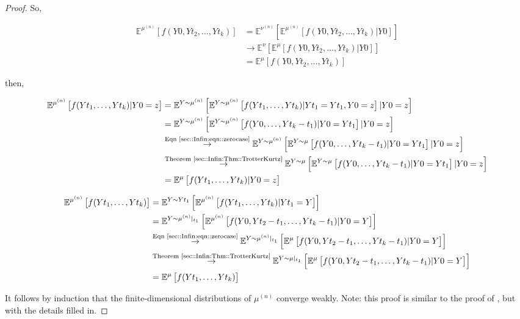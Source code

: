 \documentclass[12pt]{article}
\newcommand{\mb}{\mathbb}
\newcommand{\ra}{\rightarrow}
\newcommand{\os}{\overset}
\newcommand{\te}{\text}
\newcommand{\exmu}[2]{\mb{E}^{#1}\left[#2\right]}	%
\renewcommand{\t}{t}							%
\newcommand{\sln}[1]{^{(#1)}}					%
\newcommand{\indx}[1]{_{#1}}					%
\newcommand{\m}{\mu}							%
\newcommand{\mm}{\nu}							%
\newcommand{\XX}{Y}								%
\renewcommand{\it}{k}							%
\newcommand{\xxx}{z}							%
\begin{document}
\begin{proof}
So,

\begin{align*}
\exmu{\m\sln{n}}{f(\XX{}{0},\XX{}{\t\indx{2}},\dots,\XX{}{\t\indx{\it}})} &= \exmu{\mm\sln{n}}{\exmu{\m\sln{n}}{f(\XX{}{0},\XX{}{\t\indx{2}},\dots,\XX{}{\t\indx{\it}})|\XX{}{0}}}\\
&\ra \exmu{\mm}{\exmu{\m}{f(\XX{}{0},\XX{}{\t\indx{2}},\dots,\XX{}{\t\indx{\it}})|\XX{}{0}}}\\
&= \exmu{\m}{f(\XX{}{0},\XX{}{\t\indx{2}},\dots,\XX{}{\t\indx{\it}})}
\end{align*}

then,

\begin{align*}
\exmu{\m\sln{n}}{f(\XX{}{\t\indx{1}},\dots,\XX{}{\t\indx{\it}})|\XX{}{0}=\xxx}&=\exmu{\XX\sim\m\sln{n}}{\exmu{\XX\sim \m\sln{n}}{f(\XX{\t\indx{1}},\dots,\XX{\t\indx{\it}})|\XX{\t\indx{1}}=\XX{}{\t\indx{1}},\XX{0}=\xxx}|\XX{}{0}=\xxx}\\
&=\exmu{\XX\sim\m\sln{n}}{\exmu{\XX\sim \m\sln{n}}{f(\XX{0},\dots,\XX{\t\indx{\it}-\t\indx{1}})|\XX{0}=\XX{}{\t\indx{1}}}|\XX{}{0}=\xxx}\\
&\os{\te{Eqn \eqref{sec::Infin:eqn::zerocase}}}{\ra} \exmu{\XX\sim\m\sln{n}}{\exmu{\XX\sim \m}{f(\XX{0},\dots,\XX{\t\indx{\it}-\t\indx{1}})|\XX{0}=\XX{}{\t\indx{1}}}|\XX{}{0}=\xxx}\\
&\os{\te{Theorem \ref{sec::Infin:Thm::TrotterKurtz}}}{\ra} \exmu{\XX\sim\m}{\exmu{\XX\sim \m}{f(\XX{0},\dots,\XX{\t\indx{\it}-\t\indx{1}})|\XX{0}=\XX{}{\t\indx{1}}}|\XX{}{0}=\xxx}\\
&=\exmu{\m}{f(\XX{}{\t\indx{1}},\dots,\XX{}{\t\indx{\it}})|\XX{}{0}=\xxx}
\end{align*}

\begin{align*}
\exmu{\m\sln{n}}{f(\XX{}{\t\indx{1}},\dots,\XX{}{\t\indx{\it}})}&= \exmu{\XX\sim \XX{}{\t\indx{1}}}{\exmu{\m\sln{n}}{f(\XX{}{\t\indx{1}},\dots,\XX{}{\t\indx{\it}})|\XX{}{\t\indx{1}}=\XX}}\\
&=\exmu{\XX\sim \m\sln{n}|_{\t\indx{1}}}{\exmu{\m\sln{n}}{f(\XX{}{0},\XX{\t\indx{2}-\t\indx{1}},\dots,\XX{\t\indx{\it}-\t\indx{1}})|\XX{}{0}=\XX}}\\
&\os{\te{Eqn \eqref{sec::Infin:eqn::zerocase}}}{\ra} \exmu{\XX\sim \m\sln{n}|_{\t\indx{1}}}{\exmu{\m}{f(\XX{}{0},\XX{\t\indx{2}-\t\indx{1}},\dots,\XX{\t\indx{\it}-\t\indx{1}})|\XX{}{0}=\XX}}\\
&\os{\te{Theorem \ref{sec::Infin:Thm::TrotterKurtz}}}{\ra} \exmu{\XX\sim \m|_{\t\indx{1}}}{\exmu{\m}{f(\XX{}{0},\XX{\t\indx{2}-\t\indx{1}},\dots,\XX{\t\indx{\it}-\t\indx{1}})|\XX{}{0}=\XX}}\\
&=\exmu{\m}{f(\XX{}{\t\indx{1}},\dots,\XX{}{\t\indx{\it}})}
\end{align*}

It follows by induction that the finite-dimensional distributions of \(\m\sln{n}\) converge weakly. Note: this proof is similar to the proof of \cite[Theorem 4.2]{Kur81}, but with the details filled in.
\end{proof}
\end{document}
